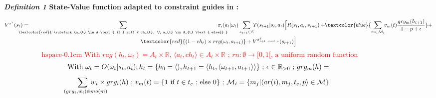 \begin{figure}[h!]
  \label{eq:single_value_function}
  \raggedright
  \textbf{\textit{Definition 1} \quad State-Value function adapted to constraint guides in :}

  \begin {scriptsize}
  \vspace{-0.6cm}
  \begin{gather*}
    V^{\pi^j}(s_t) = \hspace{-0.75cm}
    \sum_{\textcolor{red}{ \substack{a_{t} \in A \text{ if } rn() < ch_{t}, \\
          a_{t} \in A_{t} \text{ else}}
      }}{\hspace{-0.7cm} \pi_i(a_{t} | \omega_t)}
    \sum_{s_{t+1} \in S}
    {\hspace{-0.1cm} T(s_{t+1} | s_t, a_{t})
    \Bigl[R(s_t,a_{t},s_{t+1}) + \hspace{-0.1cm}
    \textcolor{blue}{ \sum_{m \in \mathcal{M}_i}{ \hspace{-0.1cm} v_m(t) \frac{grg_m(h_{t+1})}{1 - p + \epsilon} } }
    + } \\
    {\textcolor{red}{(1-ch_t) \times rrg(\omega_t,a_{t+1})} + V^{\pi^j_{i+1 \ mod \ n}}(s_{t+1})\Bigr]}
  \end{gather*}
  \vspace{-0.5cm}
  \textcolor{red}{\[\text{ \ hspace{-0.1cm} With } rag(h_t, \omega_t) = A_{t} \times \mathbb{R} \text{, } \langle a_t, ch_{t} \rangle \in A_{t} \times \mathbb{R} \text{ ; } rn: \emptyset \to [0,1[ \text{, a uniform random function}\]}
  \vspace{-0.6cm}
  \textcolor{blue}{
    \begin{gather*}
      \hspace{-0.001cm}
      \text{With } \omega_t = O(\omega_t | s_t, a_t); h_t = \{h_0 = \langle \rangle, h_{t+1} = \langle h_t, \langle \omega_{t+1}, a_{t+1} \rangle \rangle \} \text { ; } \epsilon \in \mathbb{R}_{>0} \text{ ; } grg_m(h) =
    \end{gather*}
  }
  \vspace{-0.95cm}
  \textcolor{blue}{
    \begin{gather*}
      \hspace{-0.5cm} \sum_{\hspace{0.3cm}(grg_i,w_i) \in mo(m)} {\hspace{-0.9cm} w_i \times grg_i(h)}
      \text{ ; } v_m(t) = \{ 1 \text{ if } t \in t_c \text{ ; else } 0 \} \text{ ; } \mathcal{M}_i = \{m_j | \langle ar(i),m_j,t_c,p \rangle \in \mathcal{M}\}
    \end{gather*}
  }
  \vspace{-0.6cm}
  \end{scriptsize}

\end{figure}

